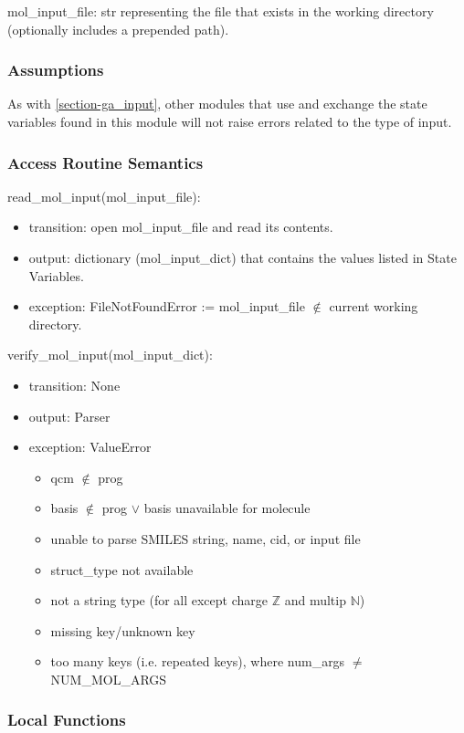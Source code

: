 \documentclass[12pt, titlepage]{article}
\begin{document}
mol\_input\_file: str representing the file that exists in the working 
directory (optionally includes a prepended path).

\subsubsection{Assumptions}

As with \ref{section-ga_input}, other modules that use and exchange the state 
variables found in this module will not raise errors related to the type of 
input.

\subsubsection{Access Routine Semantics}

\noindent read\_mol\_input(mol\_input\_file):
\begin{itemize}
	\item transition: open mol\_input\_file and read its contents.
	\item output: dictionary (mol\_input\_dict) that contains the values listed 
	in State Variables.
	\item exception: FileNotFoundError := mol\_input\_file $\notin$ current 
	working directory.
\end{itemize}

\noindent verify\_mol\_input(mol\_input\_dict):
\begin{itemize}
	\item transition: None
	\item output: Parser
	\item exception: ValueError
	\begin{itemize}
		\item qcm $\notin$ prog
		\item basis $\notin$ prog $\lor$ basis unavailable for molecule
		\item unable to parse SMILES string, name, cid, or input file
		\item struct\_type not available
		\item not a string type (for all except charge $\mathbb{Z}$ and multip 
		$\mathbb{N}$)
		\item missing key/unknown key
		\item too many keys (i.e. repeated keys), where num\_args $\neq$ 
		NUM\_MOL\_ARGS
	\end{itemize}
\end{itemize}

\subsubsection{Local Functions}
\end{document}

